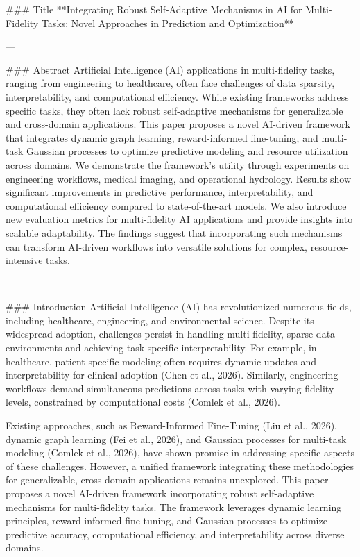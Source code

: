 ### Title
**Integrating Robust Self-Adaptive Mechanisms in AI for Multi-Fidelity Tasks: Novel Approaches in Prediction and Optimization**

---

### Abstract
Artificial Intelligence (AI) applications in multi-fidelity tasks, ranging from engineering to healthcare, often face challenges of data sparsity, interpretability, and computational efficiency. While existing frameworks address specific tasks, they often lack robust self-adaptive mechanisms for generalizable and cross-domain applications. This paper proposes a novel AI-driven framework that integrates dynamic graph learning, reward-informed fine-tuning, and multi-task Gaussian processes to optimize predictive modeling and resource utilization across domains. We demonstrate the framework's utility through experiments on engineering workflows, medical imaging, and operational hydrology. Results show significant improvements in predictive performance, interpretability, and computational efficiency compared to state-of-the-art models. We also introduce new evaluation metrics for multi-fidelity AI applications and provide insights into scalable adaptability. The findings suggest that incorporating such mechanisms can transform AI-driven workflows into versatile solutions for complex, resource-intensive tasks.

---

### Introduction
Artificial Intelligence (AI) has revolutionized numerous fields, including healthcare, engineering, and environmental science. Despite its widespread adoption, challenges persist in handling multi-fidelity, sparse data environments and achieving task-specific interpretability. For example, in healthcare, patient-specific modeling often requires dynamic updates and interpretability for clinical adoption (Chen et al., 2026). Similarly, engineering workflows demand simultaneous predictions across tasks with varying fidelity levels, constrained by computational costs (Comlek et al., 2026).

Existing approaches, such as Reward-Informed Fine-Tuning (Liu et al., 2026), dynamic graph learning (Fei et al., 2026), and Gaussian processes for multi-task modeling (Comlek et al., 2026), have shown promise in addressing specific aspects of these challenges. However, a unified framework integrating these methodologies for generalizable, cross-domain applications remains unexplored. This paper proposes a novel AI-driven framework incorporating robust self-adaptive mechanisms for multi-fidelity tasks. The framework leverages dynamic learning principles, reward-informed fine-tuning, and Gaussian processes to optimize predictive accuracy, computational efficiency, and interpretability across diverse domains.

